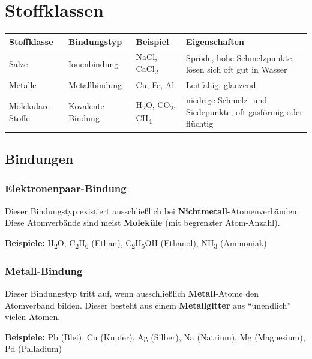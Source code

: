 \section{Stoffklassen}

\small{\begin{tabularx}{\columnwidth}{|l|l|l|X|}
	\hline
	\textbf{Stoffklasse} & \textbf{Bindungstyp} & \textbf{Beispiel} & \textbf{Eigenschaften} \\
	\hline
	Salze & Ionenbindung & NaCl, CaCl\textsubscript{2} & Spröde, \newline hohe Schmelzpunkte, lösen sich oft gut in Wasser \\
	\hline
	Metalle & Metallbindung & Cu, Fe, Al & Leitfähig, glänzend \\
	\hline
	Molekulare Stoffe & Kovalente Bindung & H\textsubscript{2}O, CO\textsubscript{2}, CH\textsubscript{4} & niedrige Schmelz- und Siedepunkte, oft gasförmig oder flüchtig \\
	\hline
\end{tabularx}}

\subsection{Bindungen}

\subsubsection{Elektronenpaar-Bindung}

Dieser Bindungstyp existiert ausschließlich bei \textbf{Nichtmetall}-Atomenverbänden. \newline Diese Atomverbände sind meist \textbf{Moleküle} (mit begrenzter Atom-Anzahl).

\textbf{Beispiele:} H\textsubscript{2}O, C\textsubscript{2}H\textsubscript{6} (Ethan), C\textsubscript{2}H\textsubscript{5}OH (Ethanol), NH\textsubscript{3} (Ammoniak)

\subsubsection{Metall-Bindung}

Dieser Bindungstyp tritt auf, wenn ausschließlich \textbf{Metall}-Atome den Atomverband bilden. Dieser besteht aus einem \textbf{Metallgitter} aus ``unendlich'' vielen Atomen.

\textbf{Beispiele:} Pb (Blei), Cu (Kupfer), Ag (Silber), Na (Natrium), Mg (Magnesium), Pd (Palladium)

